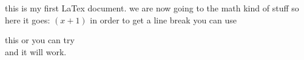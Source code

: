 \documentclass [11pt] {article}
\begin{document}
this is my first LaTex document.
we are now going to the math kind of stuff so here
it goes: $(x+1)$ in order to get a line break you can use 

this or you can try \\ and it will work.
\end{document}
